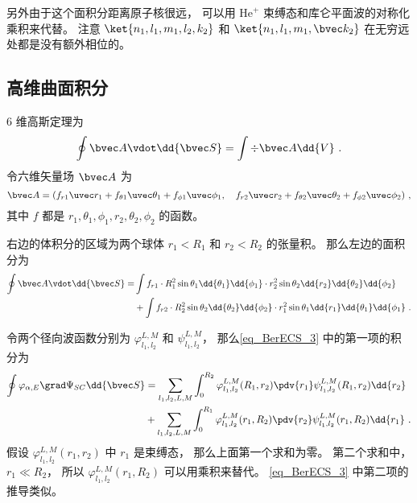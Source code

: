 另外由于这个面积分距离原子核很远， 可以用 $\mathrm{He}^+$ 束缚态和库仑平面波的对称化乘积来代替。 注意 $\ket{n_1,l_1,m_1,l_2,k_2}$ 和 $\ket{n_1,l_1,m_1,\bvec k_2}$ 在无穷远处都是没有额外相位的。

\subsection{高维曲面积分}
6 维高斯定理为
\begin{equation}
\oint \bvec A\vdot \dd{\bvec S} = \int \div \bvec A \dd{V}~.
\end{equation}
令六维矢量场 $\bvec A$ 为
\begin{equation}
\bvec A = (f_{r1} \uvec r_1 + f_{\theta1}\uvec \theta_1 + f_{\phi1}\uvec \phi_1, \quad f_{r2} \uvec r_2 + f_{\theta2}\uvec \theta_2 + f_{\phi2}\uvec \phi_2)~,
\end{equation}
其中 $f$ 都是 $r_1,\theta_1,\phi_1,r_2,\theta_2,\phi_2$ 的函数。

右边的体积分的区域为两个球体 $r_1<R_1$ 和 $r_2<R_2$ 的张量积。 那么左边的面积分为
\begin{equation}
\begin{aligned}
\oint \bvec A\vdot \dd{\bvec S} =&\int f_{r1}\cdot  R_1^2\sin\theta_1\dd{\theta_1}\dd{\phi_1}\cdot r_2^2\sin\theta_2 \dd{r_2}\dd{\theta_2}\dd{\phi_2}\\
&+\int f_{r2}\cdot  R_2^2\sin\theta_2\dd{\theta_2}\dd{\phi_2}\cdot r_1^2\sin\theta_1 \dd{r_1}\dd{\theta_1}\dd{\phi_1}~.
\end{aligned}
\end{equation}


令两个径向波函数分别为 $\varphi_{l_1,l_2}^{L,M}$ 和 $\psi_{l_1,l_2}^{L,M}$， 那么\autoref{eq_BerECS_3} 中的第一项的积分为
\begin{equation}
\begin{aligned}
\oint \varphi_{\alpha,E} \grad \Psi_{SC} \dd{\bvec S} &= \sum_{l_1,l_2,L,M}\int_0^{R_2} \varphi_{l_1,l_2}^{L,M}(R_1,r_2) \pdv{r_1} \psi_{l_1,l_2}^{L,M}(R_1,r_2)\dd{r_2}\\
&+\sum_{l_1,l_2,L,M}\int_0^{R_1} \varphi_{l_1,l_2}^{L,M}(r_1,R_2) \pdv{r_2} \psi_{l_1,l_2}^{L,M}(r_1,R_2)\dd{r_1}~.
\end{aligned}
\end{equation}
假设 $\varphi_{l_1,l_2}^{L,M}(r_1,r_2)$ 中 $r_1$ 是束缚态， 那么上面第一个求和为零。 第二个求和中， $r_1 \ll R_2$， 所以 $\varphi_{l_1,l_2}^{L,M}(r_1,R_2)$ 可以用乘积来替代。 \autoref{eq_BerECS_3} 中第二项的推导类似。
